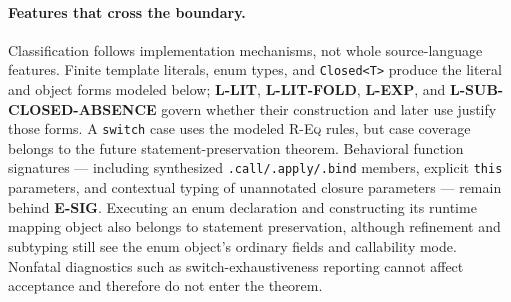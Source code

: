 \documentclass[11pt]{article}
\begin{document}
\paragraph{Features that cross the boundary.}
Classification follows implementation mechanisms, not whole source-language
features. Finite template literals, enum types, and \texttt{Closed<T>} produce
the literal and object forms modeled below; \textbf{L-LIT},
\textbf{L-LIT-FOLD}, \textbf{L-EXP}, and
\textbf{L-SUB-CLOSED-ABSENCE} govern whether their construction and later use
justify those forms. A \texttt{switch} case uses the modeled \textsc{R-Eq} rules, but
case coverage belongs to the future statement-preservation theorem. Behavioral
function signatures — including synthesized \texttt{.call/.apply/.bind}
members, explicit \texttt{this} parameters, and contextual typing of
unannotated closure parameters — remain behind \textbf{E-SIG}. Executing an
enum declaration and
constructing its runtime mapping object also belongs to statement preservation,
although refinement and subtyping still see the enum object's ordinary fields
and callability mode. Nonfatal diagnostics such as switch-exhaustiveness
reporting cannot affect acceptance and therefore do not enter the theorem.
\end{document}
